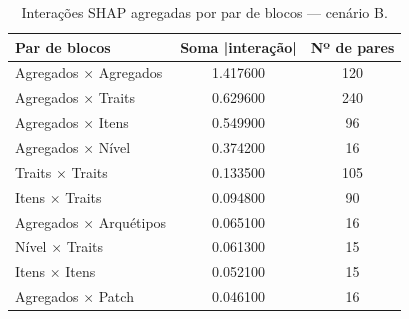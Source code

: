 \begin{table}[htbp]
\caption{Interações SHAP agregadas por par de blocos — cenário B.}
\label{tab:interbB}
\centering
\small
\begin{tabular}{lcc}
\toprule
Par de blocos & Soma |interação| & Nº de pares \\
\midrule
Agregados × Agregados & 1.417600 & 120 \\
Agregados × Traits & 0.629600 & 240 \\
Agregados × Itens & 0.549900 & 96 \\
Agregados × Nível & 0.374200 & 16 \\
Traits × Traits & 0.133500 & 105 \\
Itens × Traits & 0.094800 & 90 \\
Agregados × Arquétipos & 0.065100 & 16 \\
Nível × Traits & 0.061300 & 15 \\
Itens × Itens & 0.052100 & 15 \\
Agregados × Patch & 0.046100 & 16 \\
\bottomrule
\end{tabular}
\end{table}
